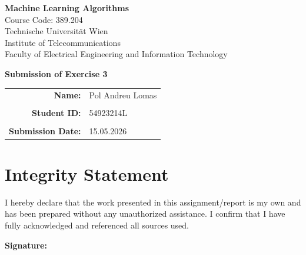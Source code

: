 \documentclass{article}
\begin{document}

\begin{titlepage}

\begin{flushright}
\end{flushright}

\vspace{1cm}

\begin{center}
    {\LARGE \textbf{Machine Learning Algorithms}}\\[0.5cm]
    {\Large Course Code: 389.204}\\[0.5cm]
    {\large Technische Universit\"at Wien}\\
    {\large Institute of Telecommunications}\\
    {\large Faculty of Electrical Engineering and Information Technology}
\end{center}

\vspace{1.5cm}

\begin{center}
    \Large\textbf{Submission of Exercise 3}
\end{center}

\vspace{1cm}

\begin{center}
\begin{tabular}{rl}
    \textbf{Name:} & Pol Andreu Lomas\\
    \\[0.2cm]
    \textbf{Student ID:} & 54923214L \\
    \\[0.2cm]
    \textbf{Submission Date:} & 15.05.2026 \\
\end{tabular}
\end{center}

\vfill

\section*{Integrity Statement}

I hereby declare that the work presented in this assignment/report is my own and has been prepared without any unauthorized assistance. I confirm that I have fully acknowledged and referenced all sources used.

\vspace{2cm}

\noindent\textbf{Signature:} \underline{\hspace{6cm}}

\end{titlepage}
\end{document}
